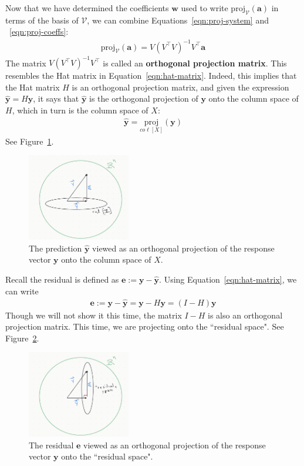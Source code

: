 \documentclass[12pt, a4paper]{article}
\theoremstyle{definition}
\begin{document}
	Now that we have determined the coefficients $\mathbf{w}$ used to write
	$\text{proj}_{\mathcal{V}}(\mathbf{a})$ in terms of the basis of $\mathcal{V}$,
	we can combine Equations~\ref{eqn:proj-system} and ~\ref{eqn:proj-coeffs}:
	\begin{align}
		\text{proj}_{\mathcal{V}}(\mathbf{a})=V(V^\top V)^{-1}V^\top \mathbf{a}\label{eqn:orthon-proj-matrix}
	\end{align}
	The matrix $V(V^\top V)^{-1}V^\top$ is called an \textbf{orthogonal projection matrix}.
	This resembles the Hat matrix in Equation~\ref{eqn:hat-matrix}. Indeed, this implies
	that the Hat matrix $H$ is an orthogonal projection matrix, and given the expression
	$\hat{\mathbf{y}}=H\mathbf{y}$, it says that $\hat{\mathbf{y}}$ is the orthogonal projection
	of $\mathbf{y}$ onto the column space of $H$, which in turn is the column space of $X$:
	\begin{align*}
		\hat{\mathbf{y}} = \underset{co\ell[X]}{\text{proj}}(\mathbf{y})
	\end{align*}
	See Figure~\ref{fig:prediction-space}.
	\begin{figure}
		\centering
		\includegraphics[width=0.4\textwidth]{prediction-orthogonal-projection}
		\caption{The prediction $\hat{\mathbf{y}}$ viewed as an orthogonal
			projection of the response vector $\mathbf{y}$ onto the column space of $X$.}
		\label{fig:prediction-space}
	\end{figure}
	Recall the residual is defined as $\mathbf{e}:=\mathbf{y}-\hat{\mathbf{y}}$.
	Using Equation~\ref{eqn:hat-matrix}, we can write
	\begin{align}
		\mathbf{e}:=\mathbf{y}-\hat{\mathbf{y}}=\mathbf{y}-H\mathbf{y} = (I-H)\mathbf{y}
	\end{align}
	Though we will not show it this time, the matrix $I-H$ is also an
	orthogonal projection matrix. This time, we are projecting onto the ``residual space".
	See Figure~\ref{fig:residual-space}.
	\begin{figure}
		\centering
		\includegraphics[width=0.4\textwidth]{residual-space}
		\caption{The residual $\mathbf{e}$ viewed as an orthogonal
			projection of the response vector $\mathbf{y}$ onto the ``residual space".}
		\label{fig:residual-space}
	\end{figure}
\end{document}
